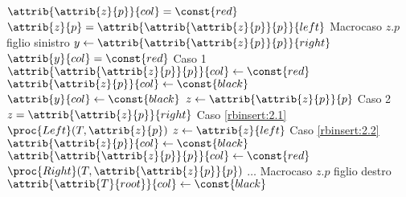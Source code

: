 \begin{codebox}
\li \While $\attrib{\attrib{z}{p}}{col} = \const{red}$
\li \Do
        \If $\attrib{z}{p} = \attrib{\attrib{\attrib{z}{p}}{p}}{left}$
        \Comment Macrocaso $z.p$ figlio sinistro
\li     \Then
            $y \gets \attrib{\attrib{\attrib{z}{p}}{p}}{right}$
\li         \If $\attrib{y}{col} = \const{red}$ \Comment Caso 1
\li         \Then
                $\attrib{\attrib{\attrib{z}{p}}{p}}{col} \gets \const{red}$
\li             $\attrib{\attrib{z}{p}}{col} \gets \const{black}$
\li             $\attrib{y}{col} \gets \const{black}$
\li             $z \gets \attrib{\attrib{z}{p}}{p}$
\li         \Else \Comment Caso 2
\li             \If $z = \attrib{\attrib{z}{p}}{right}$ \Comment Caso \ref{rbinsert:2.1}
\li             \Then
                    $\proc{Left}(T,\attrib{z}{p})$
\li                 $z \gets \attrib{z}{left}$
                \End
\zi             \Comment Caso \ref{rbinsert:2.2}
\li             $\attrib{\attrib{z}{p}}{col} \gets \const{black}$
\li             $\attrib{\attrib{\attrib{z}{p}}{p}}{col} \gets \const{red}$
\li             $\proc{Right}(T,\attrib{\attrib{z}{p}}{p})$
            \End
\li     \Else $\dots$ \Comment Macrocaso $z.p$ figlio destro
        \End
    \End
\li $\attrib{\attrib{T}{root}}{col} \gets \const{black}$
\end{codebox}